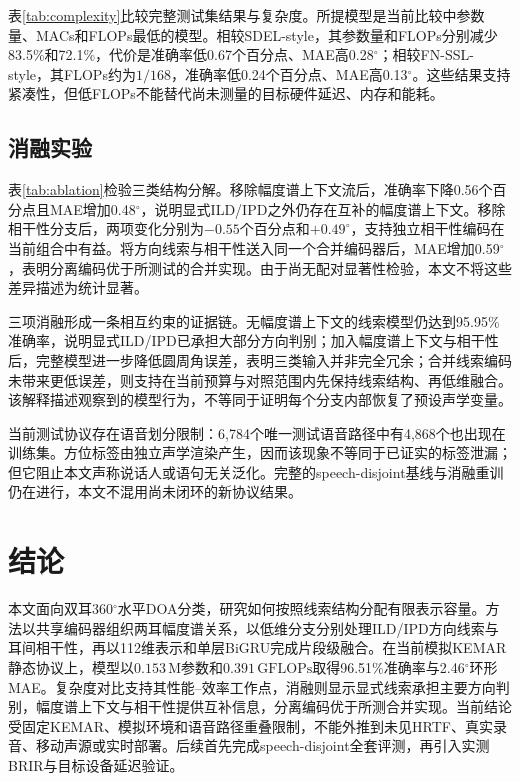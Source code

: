 \documentclass{article}
\begin{document}
表\ref{tab:complexity}比较完整测试集结果与复杂度。所提模型是当前比较中参数量、MACs和FLOPs最低的模型。相较SDEL-style，其参数量和FLOPs分别减少83.5\%和72.1\%，代价是准确率低0.67个百分点、MAE高0.28$^\circ$；相较FN-SSL-style，其FLOPs约为$1/168$，准确率低0.24个百分点、MAE高0.13$^\circ$。这些结果支持紧凑性，但低FLOPs不能替代尚未测量的目标硬件延迟、内存和能耗。

\subsection{消融实验}

表\ref{tab:ablation}检验三类结构分解。移除幅度谱上下文流后，准确率下降0.56个百分点且MAE增加0.48$^\circ$，说明显式ILD/IPD之外仍存在互补的幅度谱上下文。移除相干性分支后，两项变化分别为$-0.55$个百分点和$+0.49^\circ$，支持独立相干性编码在当前组合中有益。将方向线索与相干性送入同一个合并编码器后，MAE增加0.59$^\circ$，表明分离编码优于所测试的合并实现。由于尚无配对显著性检验，本文不将这些差异描述为统计显著。

三项消融形成一条相互约束的证据链。无幅度谱上下文的线索模型仍达到95.95\%准确率，说明显式ILD/IPD已承担大部分方向判别；加入幅度谱上下文与相干性后，完整模型进一步降低圆周角误差，表明三类输入并非完全冗余；合并线索编码未带来更低误差，则支持在当前预算与对照范围内先保持线索结构、再低维融合。该解释描述观察到的模型行为，不等同于证明每个分支内部恢复了预设声学变量。

当前测试协议存在语音划分限制：6,784个唯一测试语音路径中有4,868个也出现在训练集。方位标签由独立声学渲染产生，因而该现象不等同于已证实的标签泄漏；但它阻止本文声称说话人或语句无关泛化。完整的speech-disjoint基线与消融重训仍在进行，本文不混用尚未闭环的新协议结果。

\section{结论}

本文面向双耳360$^\circ$水平DOA分类，研究如何按照线索结构分配有限表示容量。方法以共享编码器组织两耳幅度谱关系，以低维分支分别处理ILD/IPD方向线索与耳间相干性，再以112维表示和单层BiGRU完成片段级融合。在当前模拟KEMAR静态协议上，模型以$0.153\,\mathrm{M}$参数和$0.391\,\mathrm{GFLOPs}$取得96.51\%准确率与2.46$^\circ$环形MAE。复杂度对比支持其性能--效率工作点，消融则显示显式线索承担主要方向判别，幅度谱上下文与相干性提供互补信息，分离编码优于所测合并实现。当前结论受固定KEMAR、模拟环境和语音路径重叠限制，不能外推到未见HRTF、真实录音、移动声源或实时部署。后续首先完成speech-disjoint全套评测，再引入实测BRIR与目标设备延迟验证。



\end{document}

